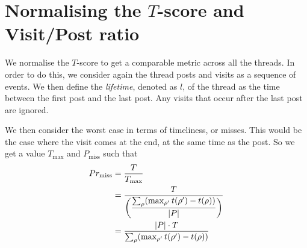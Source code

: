 %
%
%

\section{Normalising the $T$-score and Visit/Post ratio}
We normalise the $T$-score to get a comparable metric across all the threads. In 
order to do this, we consider again the thread posts and visits as a sequence of 
events. We then define the \emph{lifetime}, denoted as $l$, of the thread as the 
time between the first post and the last post. Any visits that occur after the 
last post are ignored.

We then consider the worst case in terms of timeliness, or misses. This would be 
the case where the visit comes at the end, at the same time as the post. So we 
get a value $T_{\max}$ and $P_{\text{miss}}$ such that
\begin{align*}
	\P_{\text{miss}} &= \frac{T}{T_{\max}}\\
							  &= \dfrac{T}{\left(
					\dfrac{%
			\sum_\post (\max_{\post'}t(\post') - t(\post))}{|P|}\right)} \\
					&= \dfrac{|P| \cdot T}{%
		\sum_\post (\max_{\post'}t(\post') - t(\post))}
\end{align*}


